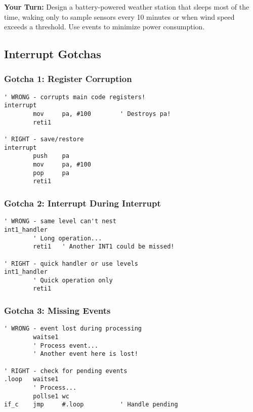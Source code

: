 \documentclass[11pt]{book}
\begin{document}
\textbf{Your Turn:} Design a battery-powered weather station that sleeps
most of the time, waking only to sample sensors every 10 minutes or when
wind speed exceeds a threshold. Use events to minimize power
consumption.

\hypertarget{interrupt-gotchas}{%
\subsection{Interrupt Gotchas}\label{interrupt-gotchas}}

\hypertarget{gotcha-1-register-corruption}{%
\subsubsection{Gotcha 1: Register
Corruption}\label{gotcha-1-register-corruption}}

\begin{lstlisting}
' WRONG - corrupts main code registers!
interrupt
        mov     pa, #100        ' Destroys pa!
        reti1
        
' RIGHT - save/restore
interrupt
        push    pa
        mov     pa, #100
        pop     pa
        reti1
\end{lstlisting}

\hypertarget{gotcha-2-interrupt-during-interrupt}{%
\subsubsection{Gotcha 2: Interrupt During
Interrupt}\label{gotcha-2-interrupt-during-interrupt}}

\begin{lstlisting}
' WRONG - same level can't nest
int1_handler
        ' Long operation...
        reti1   ' Another INT1 could be missed!
        
' RIGHT - quick handler or use levels
int1_handler
        ' Quick operation only
        reti1
\end{lstlisting}

\hypertarget{gotcha-3-missing-events}{%
\subsubsection{Gotcha 3: Missing Events}\label{gotcha-3-missing-events}}

\begin{lstlisting}
' WRONG - event lost during processing
        waitse1
        ' Process event...
        ' Another event here is lost!
        
' RIGHT - check for pending events
.loop   waitse1
        ' Process...
        pollse1 wc
if_c    jmp     #.loop          ' Handle pending
\end{lstlisting}
\end{document}
